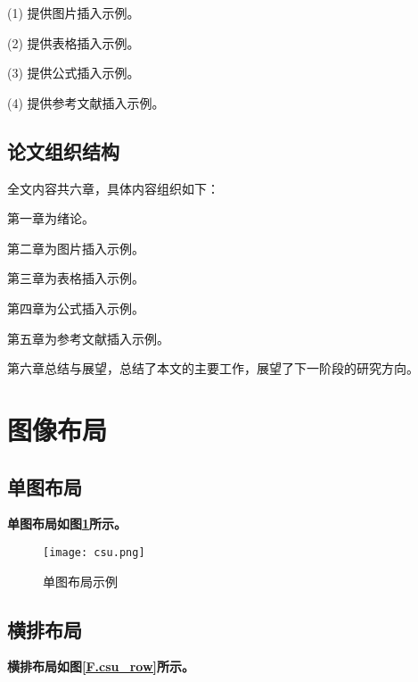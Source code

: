 (1) 提供图片插入示例。

(2) 提供表格插入示例。

(3) 提供公式插入示例。

(4) 提供参考文献插入示例。

\subsection{论文组织结构}

全文内容共六章，具体内容组织如下：

第一章为绪论。

第二章为图片插入示例。

第三章为表格插入示例。

第四章为公式插入示例。

第五章为参考文献插入示例。

第六章总结与展望，总结了本文的主要工作，展望了下一阶段的研究方向。

\clearpage

\section{图像布局}


\subsection{单图布局}



\textbf{单图布局如图\ref{F.csu_single}所示。}

\begin{figure}[hbt]
\centering
\texttt{[image: csu.png]}
\caption{单图布局示例}
\label{F.csu_single}
\end{figure}

\subsection{横排布局}

\textbf{横排布局如图\ref{F.csu_row}所示。}

